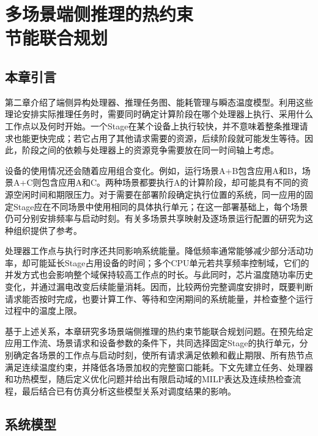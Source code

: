 
\chapter[多场景端侧推理的热约束节能联合规划]{多场景端侧推理的热约束\\节能联合规划}

\label{chap:model}



\section{本章引言}

第二章介绍了端侧异构处理器、推理任务图、能耗管理与瞬态温度模型。利用这些理论安排实际推理任务时，需要同时确定计算阶段在哪个处理器上执行、采用什么工作点以及何时开始。一个Stage在某个设备上执行较快，并不意味着整条推理请求也能更快完成；若它占用了其他请求需要的资源，后续阶段就可能发生等待。因此，阶段之间的依赖与处理器上的资源竞争需要放在同一时间轴上考虑。

设备的使用情况还会随着应用组合变化。例如，运行场景A+B包含应用A和B，场景A+C则包含应用A和C。两种场景都要执行A的计算阶段，却可能具有不同的资源空闲时间和期限压力。对于需要在部署阶段确定执行位置的系统，同一应用的固定Stage应在不同场景中使用相同的具体执行单元；在这一部署基础上，每个场景仍可分别安排频率与启动时刻。有关多场景共享映射及逐场景运行配置的研究为这种组织提供了参考\cite{kim2023scenario}。

处理器工作点与执行时序还共同影响系统能量。降低频率通常能够减少部分活动功率，却可能延长Stage占用设备的时间；多个CPU单元若共享频率控制域，它们的并发方式也会影响整个域保持较高工作点的时长。与此同时，芯片温度随功率历史变化，并通过漏电改变后续能量消耗。因而，比较两份完整调度安排时，既要判断请求能否按时完成，也要计算工作、等待和空闲期间的系统能量，并检查整个运行过程中的温度上限。

基于上述关系，本章研究多场景端侧推理的热约束节能联合规划问题。在预先给定应用工作流、场景请求和设备参数的条件下，共同选择固定Stage的执行单元，分别确定各场景的工作点与启动时刻，使所有请求满足依赖和截止期限、所有热节点满足连续温度约束，并降低各场景加权的完整窗口能耗。下文先建立任务、处理器和功热模型，随后定义优化问题并给出有限启动域的MILP表达及连续热检查流程，最后结合已有仿真分析这些模型关系对调度结果的影响。

\section{系统模型}

